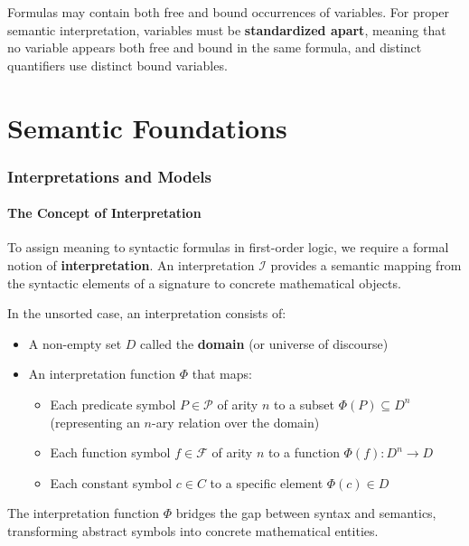 \documentclass[11pt,a4paper]{article}
\theoremstyle{definition}
\theoremstyle{plain}
\theoremstyle{remark}
\begin{document}
Formulas may contain both free and bound occurrences of variables. For proper semantic interpretation, variables must be \textbf{standardized apart}, meaning that no variable appears both free and bound in the same formula, and distinct quantifiers use distinct bound variables.



\newpage

\part{Semantic Foundations}

\section{Interpretations and Models}

\subsection{The Concept of Interpretation}

To assign meaning to syntactic formulas in first-order logic, we require a formal notion of \textbf{interpretation}. An interpretation $\mathcal{I}$ provides a semantic mapping from the syntactic elements of a signature to concrete mathematical objects.

In the unsorted case, an interpretation consists of:
\begin{itemize}
    \item A non-empty set $D$ called the \textbf{domain} (or universe of discourse)
    \item An interpretation function $\Phi$ that maps:
    \begin{itemize}
        \item Each predicate symbol $P \in \mathcal{P}$ of arity $n$ to a subset $\Phi(P) \subseteq D^n$ (representing an $n$-ary relation over the domain)
        \item Each function symbol $f \in \mathcal{F}$ of arity $n$ to a function $\Phi(f) : D^n \rightarrow D$
        \item Each constant symbol $c \in C$ to a specific element $\Phi(c) \in D$
    \end{itemize}
\end{itemize}

The interpretation function $\Phi$ bridges the gap between syntax and semantics, transforming abstract symbols into concrete mathematical entities.
\end{document}
